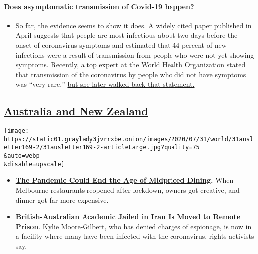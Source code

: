 \begin{itemize}
{  \paragraph{Does asymptomatic transmission of Covid-19
  happen?}\label{does-asymptomatic-transmission-of-covid-19-happen}}

  \begin{itemize}
  \tightlist
  \item
    So far, the evidence seems to show it does. A widely cited
    \href{https://www.nature.com/articles/s41591-020-0869-5}{paper}
    published in April suggests that people are most infectious about
    two days before the onset of coronavirus symptoms and estimated that
    44 percent of new infections were a result of transmission from
    people who were not yet showing symptoms. Recently, a top expert at
    the World Health Organization stated that transmission of the
    coronavirus by people who did not have symptoms was ``very rare,''
    \href{https://www.nytimes3xbfgragh.onion/2020/06/09/world/coronavirus-updates.html?action=click\&pgtype=Article\&state=default\&region=MAIN_CONTENT_3\&context=storylines_faq\#link-1f302e21}{but
    she later walked back that statement.}
  \end{itemize}
\end{itemize}

\hypertarget{australia-and-new-zealand}{%
\subsection{\texorpdfstring{\href{https://www.nytimes3xbfgragh.onion/section/world/australia}{Australia
and New
Zealand}}{Australia and New Zealand}}\label{australia-and-new-zealand}}

\texttt{[image: https://static01.graylady3jvrrxbe.onion/images/2020/07/31/world/31ausletter169-2/31ausletter169-2-articleLarge.jpg?quality=75\\\&auto=webp\\\&disable=upscale]}

\begin{itemize}
\tightlist
\item
  \textbf{\href{https://www.nytimes3xbfgragh.onion/2020/07/28/dining/melbourne-restaurants-coronavirus.html}{The
  Pandemic Could End the Age of Midpriced Dining}.} When Melbourne
  restaurants reopened after lockdown, owners got creative, and dinner
  got far more expensive.
\end{itemize}

\begin{itemize}
\tightlist
\item
  \textbf{\href{https://www.nytimes3xbfgragh.onion/2020/07/28/world/europe/british-australian-academic-jail-iran-qarchak.html}{British-Australian
  Academic Jailed in Iran Is Moved to Remote Prison}}. Kylie
  Moore-Gilbert, who has denied charges of espionage, is now in a
  facility where many have been infected with the coronavirus, rights
  activists say.
\end{itemize}

